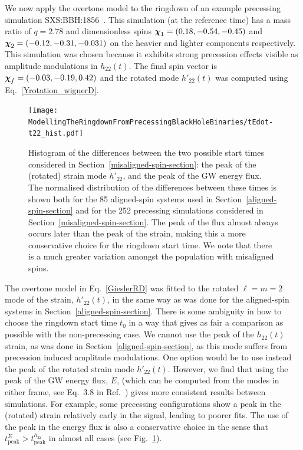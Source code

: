 We now apply the overtone model to the ringdown of an example precessing simulation SXS:BBH:1856~\cite{Varma:2019csw}. 
This simulation (at the reference time) has a mass ratio of $q=2.78$ and dimensionless spins $\vb*{\chi}_1=(0.18, -0.54, -0.45)$ and $\vb*{\chi}_2=(-0.12, -0.31, -0.031)$ on the heavier and lighter components respectively. 
This simulation was chosen because it exhibits strong precession effects visible as amplitude modulations in $h_{22}(t)$. The final spin vector is $\vb*{\chi}_f=(-0.03,-0.19,0.42)$ and the rotated mode $h'_{22}(t)$ was computed using Eq.~\ref{Yrotation_wignerD}.

\begin{figure}[t]
    \centering
    \texttt{[image: ModellingTheRingdownFromPrecessingBlackHoleBinaries/tEdot-t22\_hist.pdf]}
    \caption[Differences in the times of peak strain amplitude and peak gravitational-wave luminosity for aligned- and misaligned-spin SXS simulations]{  
    Histogram of the differences between the two possible start times considered in Section~\ref{misaligned-spin-section}: the peak of the (rotated) strain mode $h'_{22}$, and the peak of the GW energy flux.
    The normalised distribution of the differences between these times is shown both for the 85 aligned-spin systems used in Section~\ref{aligned-spin-section} and for the 252 precessing simulations considered in Section~\ref{misaligned-spin-section}. 
    The peak of the flux almost always occurs later than the peak of the strain, making this a more conservative choice for the ringdown start time. 
    We note that there is a much greater variation amongst the population with misaligned spins.
    }
    \label{tEdot-t22}
\end{figure}

The overtone model in Eq.~\ref{GieslerRD} was fitted to the rotated $\ell=m=2$ mode of the strain, $h'_{22}(t)$, in the same way as was done for the aligned-spin systems in Section~\ref{aligned-spin-section}.
There is some ambiguity in how to choose the ringdown start time $t_0$ in a way that gives as fair a comparison as possible with the non-precessing case. 
We cannot use the peak of the $h_{22}(t)$ strain, as was done in Section~\ref{aligned-spin-section}, as this mode suffers from precession induced amplitude modulations. 
One option would be to use instead the peak of the rotated strain mode $h'_{22}(t)$.
However, we find that using the peak of the GW energy flux, $\dot{E}$, (which can be computed from the modes in either frame, see Eq.~3.8 in Ref.~\cite{Ruiz:2007yx}) gives more consistent results between simulations. For example, some precessing configurations show a peak in the (rotated) strain relatively early in the signal, leading to poorer fits.
The use of the peak in the energy flux is also a conservative choice in the sense that $t_{\mathrm{peak}}^{\dot{E}} > t_{\mathrm{peak}}^{h_{22}}$ in almost all cases (see Fig.~\ref{tEdot-t22}).

